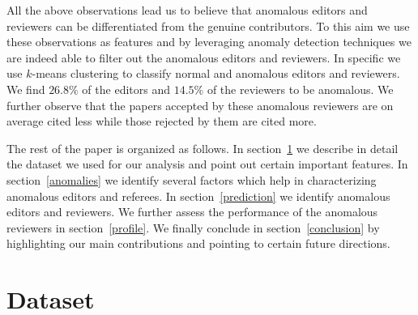  All the above observations lead us to believe that anomalous editors and reviewers can be differentiated from the genuine contributors. To this aim we use these observations as features and by leveraging anomaly detection techniques we are indeed able to filter out the anomalous editors and reviewers. In specific we use $k$-means clustering \cite{hartigan1979algorithm} to classify normal and anomalous editors and reviewers.
We find $26.8\%$ of the editors and $14.5\%$ of the reviewers to be anomalous.
We further observe that the papers accepted by these anomalous reviewers are on average cited less while those rejected by them are cited more. 


 The rest of the paper is organized as follows. In section~\ref{dataset} we describe in detail the dataset we used for our analysis and point out certain important features. In section~\ref{anomalies} we identify several factors which help in characterizing anomalous editors and referees. In section~\ref{prediction} we identify anomalous editors and reviewers. 
We further assess the performance of the anomalous reviewers in section~\ref{profile}. 
We finally conclude in section~\ref{conclusion} by highlighting our main contributions and pointing to certain future directions.

%

\section{Dataset}
\label{dataset}

